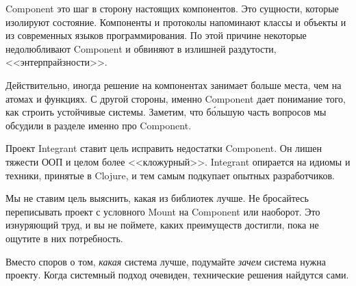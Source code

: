 Component это шаг в сторону настоящих компонентов. Это сущности, которые
изолируют состояние. Компоненты и протоколы напоминают классы и объекты и из
современных языков программирования. По этой причине некоторые недолюбливают
Component и обвиняют в излишней раздутости, <<энтерпрайзности>>.

Действительно, иногда решение на компонентах занимает больше места, чем на
атомах и функциях. С другой стороны, именно Component дает понимание того, как
строить устойчивые системы. Заметим, что б\'{о}льшую часть вопросов мы обсудили
в разделе именно про Component.

Проект Integrant ставит цель исправить недостатки Component. Он лишен тяжести
ООП и целом более <<кложурный>>. Integrant опирается на идиомы и техники,
принятые в Clojure, и тем самым подкупает опытных разработчиков.

Мы не ставим цель выяснить, какая из библиотек лучше. Не бросайтесь переписывать
проект с условного Mount на Component или наоборот. Это изнуряющий труд, и вы не
поймете, каких преимуществ достигли, пока не ощутите в них потребность.

Вместо споров о том, \emph{какая} система лучше, подумайте \emph{зачем} система
нужна проекту. Когда системный подход очевиден, технические решения найдутся
сами.
